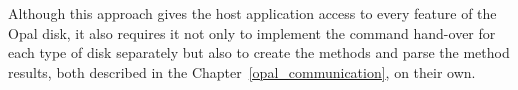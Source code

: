 Although this approach gives the host application access to every feature of the Opal disk, it also requires it not only to implement the command hand-over for each type of disk separately but also to create the methods and parse the method results, both described in the Chapter~\ref{opal_communication}, on their own.




 